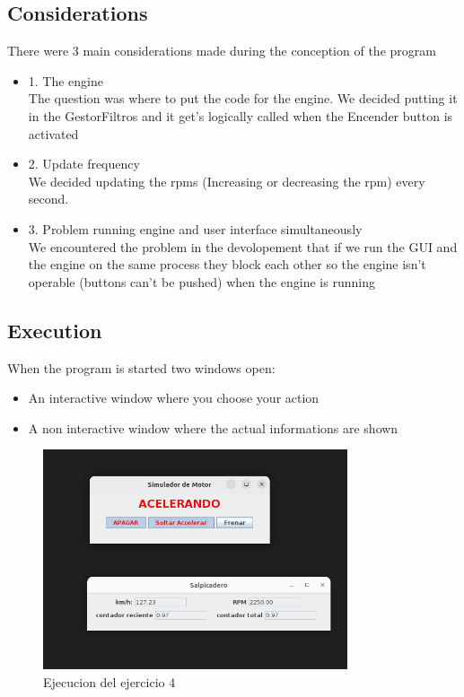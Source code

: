 \documentclass{article}
\begin{document}
\subsection{Considerations}
There were 3 main considerations made during the conception of the program
\begin{itemize}
   
\item 1. The engine\\
The question was where to put the code for the engine. We decided putting it in the GestorFiltros and it get's logically called when the Encender button is activated
\item 2. Update frequency\\
We decided updating the rpms (Increasing or decreasing the rpm) every second. 
\item 3. Problem running engine and user interface simultaneously\\
We encountered the problem in the devolopement that if we run the GUI and the engine on the same process they block each other so the engine isn't operable (buttons can't be pushed) when the engine is running
\end{itemize}

\subsection{Execution}
When the program is started two windows open:
\begin{itemize}
    \item An interactive window where you choose your action
    \item A non interactive window where the actual informations are shown
\end{itemize}
\begin{figure}[h]
	\centering
        \vspace{15pt}
	\includegraphics[width=0.8\textwidth]{exec_ej4.png}
	\caption{Ejecucion del ejercicio 4}
	\label{fig:ej4}
\end{figure}
\end{document}
